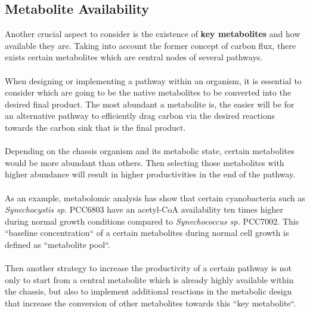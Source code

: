 \subsection{Metabolite Availability}
Another crucial aspect to consider is the existence of \textbf{key metabolites} and how available they are. Taking into account the former concept of carbon flux, there exists certain metabolites which are central nodes of several pathways. \\ \\
When designing or implementing a pathway within an organism, it is essential to consider which are going to be the native metabolites to be converted into the desired final product. The most abundant a metabolite is, the easier will be for an alternative pathway to efficiently drag carbon via the desired reactions towards the carbon sink that is the final product. \\ \\
Depending on the chassis organism and its metabolic state, certain metabolites would be more abundant than others. Then selecting those metabolites with higher abundance will result in higher productivities in the end of the pathway. \\ \\
As an example, metabolomic analysis has show that certain cyanobacteria such as \textit{Synechocystis sp.} PCC6803 have an acetyl-CoA availability ten times higher during normal growth conditions compared to \textit{Synechococcus sp.} PCC7002. This “baseline concentration“ of a certain metabolites during normal cell growth is defined as “metabolite pool“. \\ \\
Then another strategy to increase the productivity of a certain pathway is not only to start from a central metabolite which is already highly available within the chassis, but also to implement additional reactions in the metabolic design that increase the conversion of other metabolites towards this “key metabolite“.
